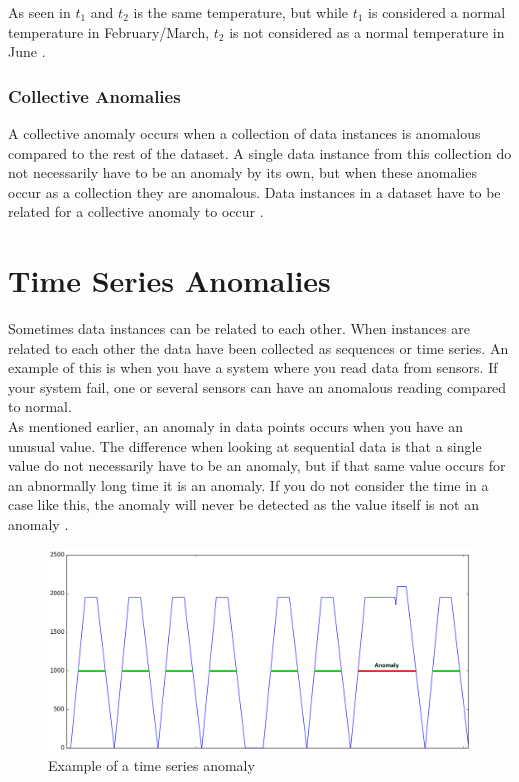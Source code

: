\documentclass[english, a4paper]{report}
\begin{document}
{{{{                \par
                As seen in  $t_1$ and $t_2$ is the same temperature, but while $t_1$ is considered a normal temperature in February/March, $t_2$ is not considered as a normal temperature in June \cite{anomalyDetection}. 
            }
            
            \subsubsection{Collective Anomalies}
            {
                A collective anomaly occurs when a collection of data instances is anomalous compared to the rest of the dataset. A single data instance from this collection do not necessarily have to be an anomaly by its own, but when these anomalies occur as a collection they are anomalous. Data instances in a dataset have to be related for a collective anomaly to occur \cite{anomalyDetection}. 
            }
        }
    }
    
    \section{Time Series Anomalies} \label{anomalyDetectionTimeSeries}
    {
        Sometimes data instances can be related to each other. When instances are related to each other the data have been collected as sequences or time series. An example of this is when you have a system where you read data from sensors. If your system fail, one or several sensors can have an anomalous reading compared to normal. \\
        As mentioned earlier, an anomaly in data points occurs when you have an unusual value. The difference when looking at sequential data is that a single value do not necessarily have to be an anomaly, but if that same value occurs for an abnormally long time it is an anomaly. If you do not consider the time in a case like this, the anomaly will never be detected as the value itself is not an anomaly \cite{anomalyDetectionOfTimeSeries}.
        
        \begin{figure}[H]
            \centering
            \includegraphics[width=\textwidth]{timeSeriesAnomaly}
            \caption{Example of a time series anomaly}
            \label{fig:timeSeriesAD}
        \end{figure}
        
}}
\end{document}
